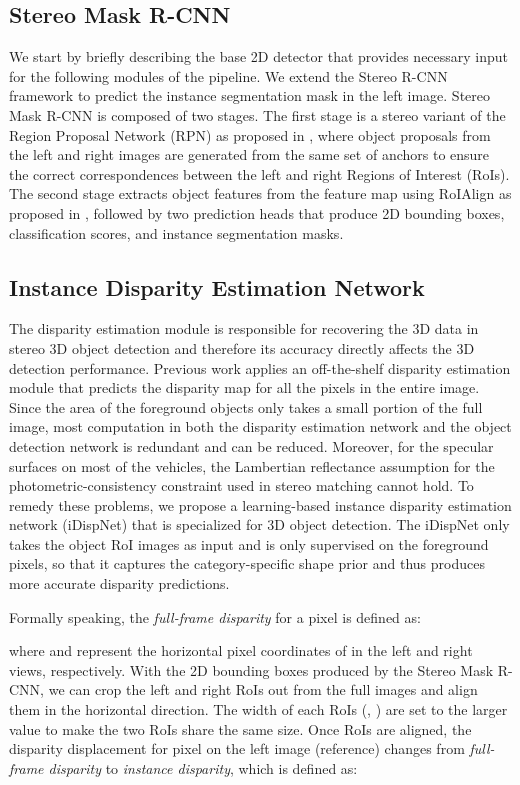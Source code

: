 \documentclass[10pt,twocolumn,letterpaper]{article}
\begin{document}
\subsection{Stereo Mask R-CNN}\label{sec:method-smrcnn}
We start by briefly describing the base 2D detector that provides necessary input for the following modules of the pipeline. We extend the Stereo R-CNN \cite{li2019stereo} framework to predict the instance segmentation mask in the left image. Stereo Mask R-CNN is composed of two stages.
The first stage is a stereo variant of the Region Proposal Network (RPN) as proposed in \cite{li2019stereo}, where object proposals from the left and right images are generated from the same set of anchors to ensure the correct correspondences between the left and right Regions of Interest (RoIs).
The second stage extracts object features from the feature map using RoIAlign as proposed in \cite{he2017mask}, followed by two prediction heads that produce 2D bounding boxes, classification scores, and instance segmentation masks.

\subsection{Instance Disparity Estimation Network}\label{sec:method-disp-est}
The disparity estimation module is responsible for recovering the 3D data in stereo 3D object detection and therefore its accuracy directly affects the 3D detection performance. 
Previous work \cite{wang2019pseudo} applies an off-the-shelf disparity estimation module that predicts the disparity map for all the pixels in the entire image.
Since the area of the foreground objects only takes a small portion of the full image, 
most computation in both the disparity estimation network and the object detection network is redundant and can be reduced.
Moreover, for the specular surfaces on most of the vehicles, the Lambertian reflectance assumption for the photometric-consistency constraint used in stereo matching cannot hold.
To remedy these problems, we propose a learning-based instance disparity estimation network (iDispNet) that is specialized for 3D object detection.
The iDispNet only takes the object RoI images as input and is only supervised on the foreground pixels, so that it captures the category-specific shape prior and thus produces more accurate disparity predictions.

Formally speaking, the \textit{full-frame disparity} for a pixel  is defined as:

where  and  represent the horizontal pixel coordinates of  in the left and right views, respectively.
With the 2D bounding boxes produced by the Stereo Mask R-CNN, we can crop the left and right RoIs out from the full images and align them in the horizontal direction.
The width of each RoIs (, ) are set to the larger value to make the two RoIs share the same size. 
Once RoIs are aligned, the disparity displacement for pixel  on the left image (reference) changes from \textit{full-frame disparity} to 
\textit{instance disparity}, which is defined as:
\end{document}
